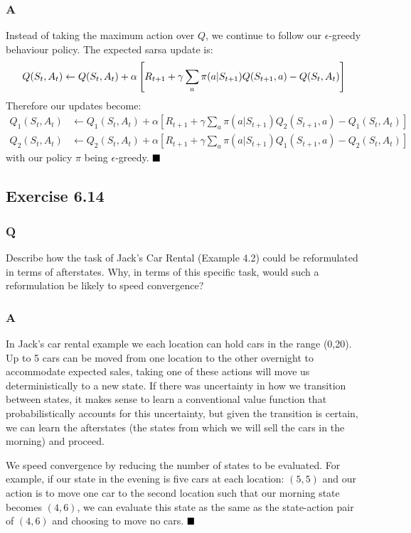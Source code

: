 \subsubsection{A}
Instead of taking the maximum action over $Q$, we continue to follow our $\epsilon$-greedy behaviour policy. The expected sarsa update is:
\begin{equation}
Q(S_t, A_t) \leftarrow Q(S_t, A_t) + \alpha \left[R_{t+1} + \gamma \sum_{a} \pi(a | S_{t+1}) Q(S_{t+1}, a) - Q(S_t, A_t) \right] \\
\end{equation}
Therefore our updates become:
\begin{align}
Q_1(S_t, A_t) &\leftarrow Q_1(S_t, A_t) + \alpha \left[R_{t+1} + \gamma \sum_{a} \pi(a | S_{t+1}) Q_2(S_{t+1}, a) - Q_1(S_t, A_t) \right]  \\
Q_2(S_t, A_t) &\leftarrow Q_2(S_t, A_t) + \alpha \left[R_{t+1} + \gamma \sum_{a} \pi(a | S_{t+1}) Q_1(S_{t+1}, a) - Q_2(S_t, A_t) \right]
\end{align}
with our policy $\pi$ being $\epsilon$-greedy.
$
\hfill \blacksquare
$

\subsection{Exercise 6.14}
\subsubsection{Q}
Describe how the task of Jack’s Car Rental (Example 4.2) could be reformulated in terms of afterstates. Why, in terms of this specific task, would such a reformulation be likely to speed convergence?
\subsubsection{A}
In Jack's car rental example we each location can hold cars in the range (0,20). Up to 5 cars can be moved from one location to the other overnight to accommodate expected sales, taking one of these actions will move us deterministically to a new state. If there was uncertainty in how we transition between states, it makes sense to learn a conventional value function that probabilistically accounts for this uncertainty, but given the transition is certain, we can learn the afterstates (the states from which we will sell the cars in the morning) and proceed.

We speed convergence by reducing the number of states to be evaluated. For example, if our state in the evening is five cars at each location: $(5,5)$ and our action is to move one car to the second location such that our morning state becomes $(4,6)$, we can evaluate this state as the same as the state-action pair of $(4,6)$ and choosing to move no cars.
$
\hfill \blacksquare
$
